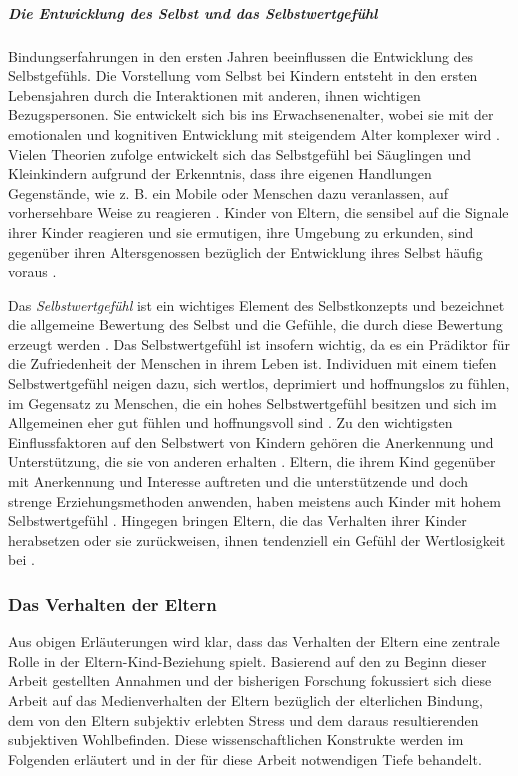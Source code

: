 \subparagraph{Die Entwicklung des Selbst und das Selbstwertgefühl}\label{par:EntwSelbst}
Bindungserfahrungen in den ersten Jahren beeinflussen die Entwicklung des Selbstgefühls. Die Vorstellung vom Selbst bei Kindern entsteht in den ersten Lebensjahren durch die Interaktionen mit anderen, ihnen wichtigen Bezugspersonen. Sie entwickelt sich bis ins Erwachsenenalter, wobei sie mit der emotionalen und kognitiven Entwicklung mit steigendem Alter komplexer wird \cite[S.~602 ff.]{Siegler2008}. Vielen Theorien zufolge entwickelt sich das Selbstgefühl bei Säuglingen und Kleinkindern aufgrund der Erkenntnis, dass ihre eigenen Handlungen Gegenstände, wie z. B. ein Mobile oder Menschen dazu veranlassen, auf vorhersehbare Weise zu reagieren \cite{Harter1998}. Kinder von Eltern, die sensibel auf die Signale ihrer Kinder reagieren und sie ermutigen, ihre Umgebung zu erkunden, sind gegenüber ihren Altersgenossen bezüglich der Entwicklung ihres Selbst häufig voraus \cite{Pipp1992}. 

Das \textit{Selbstwertgefühl} ist ein wichtiges Element des Selbstkonzepts und bezeichnet die allgemeine Bewertung des Selbst und die Gefühle, die durch diese Bewertung erzeugt werden \cite{Crocker2001}. Das Selbstwertgefühl ist insofern wichtig, da es ein Prädiktor für die Zufriedenheit der Menschen in ihrem Leben ist. Individuen mit einem tiefen Selbstwertgefühl neigen dazu, sich wertlos, deprimiert und hoffnungslos zu fühlen, im Gegensatz zu Menschen, die ein hohes Selbstwertgefühl besitzen und sich im Allgemeinen eher gut fühlen und hoffnungsvoll sind \cite{Harter1999}. Zu den wichtigsten Einflussfaktoren auf den Selbstwert von Kindern gehören die Anerkennung und Unterstützung, die sie von anderen erhalten \cite{Siegler2008}. Eltern, die ihrem Kind gegenüber mit Anerkennung und Interesse auftreten und die unterstützende und doch strenge Erziehungsmethoden anwenden, haben meistens auch Kinder mit hohem Selbstwertgefühl \cite{Feiring1996}. Hingegen bringen Eltern, die das Verhalten ihrer Kinder herabsetzen oder sie zurückweisen, ihnen tendenziell ein Gefühl der Wertlosigkeit bei \cite{Harter1999}. 

\subsubsection{Das Verhalten der Eltern}\label{sec:Medienverhalten}
Aus obigen Erläuterungen wird klar, dass das Verhalten der Eltern eine zentrale Rolle in der Eltern-Kind-Beziehung spielt. Basierend auf den zu Beginn dieser Arbeit gestellten Annahmen und der bisherigen Forschung fokussiert sich diese Arbeit auf das Medienverhalten der Eltern bezüglich der elterlichen Bindung, dem von den Eltern subjektiv erlebten Stress und dem daraus resultierenden subjektiven Wohlbefinden. Diese wissenschaftlichen Konstrukte werden im Folgenden erläutert und in der für diese Arbeit notwendigen Tiefe behandelt.


